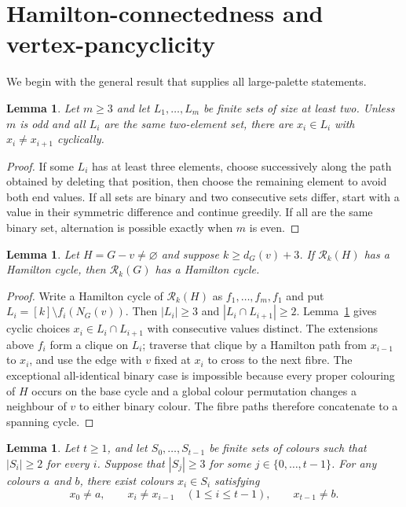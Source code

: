 \documentclass[11pt]{article}
\newtheorem{lemma}[theorem]{Lemma}
\theoremstyle{remark}
\newcommand{\Rk}{\mathcal R_k}
\numberwithin{equation}{section}
\numberwithin{table}{section}
\begin{document}
\section{Hamilton-connectedness and vertex-pancyclicity}
\label{sec:degenerate}

We begin with the general result that supplies all large-palette statements.

\begin{lemma}
\label{lem:list-cycle}
Let $m\ge3$ and let $L_1,\ldots,L_m$ be finite sets of size at least two.  Unless $m$ is odd and all $L_i$ are the same two-element set, there are $x_i\in L_i$ with $x_i\ne x_{i+1}$ cyclically.
\end{lemma}

\begin{proof}
If some $L_i$ has at least three elements, choose successively along the path obtained by deleting that position, then choose the remaining element to avoid both end values.  If all sets are binary and two consecutive sets differ, start with a value in their symmetric difference and continue greedily.  If all are the same binary set, alternation is possible exactly when $m$ is even.
\end{proof}

\begin{lemma}
\label{lem:single-lift}
Let $H=G-v\ne\varnothing$ and suppose $k\ge d_G(v)+3$.  If $\Rk(H)$ has a Hamilton cycle, then $\Rk(G)$ has a Hamilton cycle.
\end{lemma}

\begin{proof}
Write a Hamilton cycle of $\Rk(H)$ as $f_1,\ldots,f_m,f_1$ and put $L_i=[k]\setminus f_i(N_G(v))$.  Then $|L_i|\ge3$ and $|L_i\cap L_{i+1}|\ge2$.  Lemma~\ref{lem:list-cycle} gives cyclic choices $x_i\in L_i\cap L_{i+1}$ with consecutive values distinct.  The extensions above $f_i$ form a clique on $L_i$; traverse that clique by a Hamilton path from $x_{i-1}$ to $x_i$, and use the edge with $v$ fixed at $x_i$ to cross to the next fibre.  The exceptional all-identical binary case is impossible because every proper colouring of $H$ occurs on the base cycle and a global colour permutation changes a neighbour of $v$ to either binary colour.  The fibre paths therefore concatenate to a spanning cycle.
\end{proof}


\begin{lemma}\label{lem:bridge-colours}
Let $t\ge1$, and let $S_0,\ldots,S_{t-1}$ be finite sets of colours
such that $|S_i|\ge2$ for every $i$. Suppose that $|S_j|\ge3$ for
some $j\in\{0,\ldots,t-1\}$. For any colours $a$ and $b$, there exist
colours $x_i\in S_i$ satisfying
\[
x_0\ne a,\qquad
x_i\ne x_{i-1}\quad(1\le i\le t-1),\qquad
x_{t-1}\ne b.
\]
\end{lemma}
\end{document}
